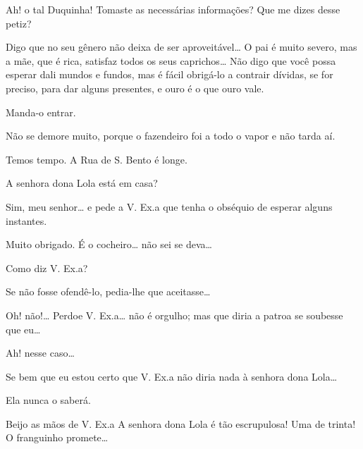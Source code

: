  Ah! o tal Duquinha! Tomaste as necessárias informações? Que me dizes
desse petiz?

  Digo que no seu
gênero não deixa de ser aproveitável\ldots{} O pai é muito severo, mas a mãe,
que é rica, satisfaz todos os seus caprichos\ldots{} Não digo que você possa esperar dali
mundos e fundos, mas é fácil obrigá-lo a contrair dívidas, se for preciso, para dar
alguns presentes, e ouro é o que ouro vale.

 Manda-o entrar.

 Não se demore muito, porque o fazendeiro foi a todo o vapor e
não tarda aí.

 Temos tempo. A Rua de S. Bento é longe. 



 A senhora dona Lola está em casa?

  Sim, meu senhor\ldots{} e pede a V. Ex.a que
tenha o obséquio de esperar alguns instantes.

 Muito obrigado.  É o cocheiro\ldots{} não sei se deva\ldots{}

 Como diz V. Ex.a?

 Se não fosse ofendê-lo, pedia-lhe que aceitasse\ldots{} 

 Oh! não!\ldots{} Perdoe V. Ex.a\ldots{} não é orgulho; mas que diria a
patroa se soubesse que eu\ldots{}

 Ah! nesse caso\ldots{} 

  Se bem que eu estou certo que V. Ex.a
não diria nada à senhora dona Lola\ldots{}

  Ela nunca o saberá. 

 Beijo as mãos de V. Ex.a A senhora dona Lola é tão escrupulosa!
 Uma de trinta! O franguinho promete\ldots{} 


